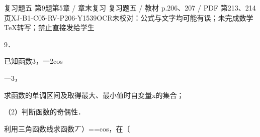 \begin{bankitem}{复习题五 第9题}{第5章 / 章末复习 复习题五 / 教材 p.206、207 / PDF 第213、214页}{XJ-B1-C05-RV-P206-Y1539}{OCR未校对：公式与文字均可能有误；未完成数学TeX转写；禁止直接发给学生}
\begin{ocrdraft}
\par
9．
\par
已知函数3，一2cos
\par
一3，
\par
[教材p.207 / PDF第214页]
\par
求函数的单调区间及取得最大、最小值时自变量x的集合；
\par
（2）判断函数的奇偶性．
\par
利用三角函数线求函数丆）==cos，在〔
\end{ocrdraft}
\end{bankitem}
